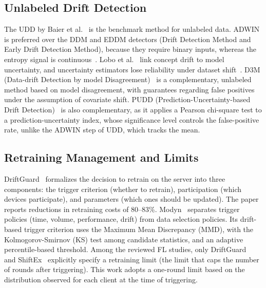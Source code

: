 \documentclass[conference]{IEEEtran}
\begin{document}
\subsection{Unlabeled Drift Detection}
The UDD by Baier et al.~\cite{baier2023} is the benchmark method for unlabeled data. ADWIN is preferred over the DDM and EDDM detectors (Drift Detection Method and Early Drift Detection Method), because they require binary inputs, whereas the entropy signal is continuous~\cite{baier2023}. Lobo et al.~\cite{lobo2023} link concept drift to model uncertainty, and uncertainty estimators lose reliability under dataset shift~\cite{ovadia2019}. D3M (Data-drift Detection by model Disagreement)~\cite{nguyen2025} is a complementary, unlabeled method based on model disagreement, with guarantees regarding false positives under the assumption of covariate shift. PUDD (Prediction-Uncertainty-based Drift Detection)~\cite{lu2025} is also complementary, as it applies a Pearson chi-square test to a prediction-uncertainty index, whose significance level controls the false-positive rate, unlike the ADWIN step of UDD, which tracks the mean.

\subsection{Retraining Management and Limits}
DriftGuard~\cite{han2026} formalizes the decision to retrain on the server into three components: the trigger criterion (whether to retrain), participation (which devices participate), and parameters (which ones should be updated). The paper reports reductions in retraining costs of 80--83\%. Modyn~\cite{bother2025} separates trigger policies (time, volume, performance, drift) from data selection policies. Its drift-based trigger criterion uses the Maximum Mean Discrepancy (MMD), with the Kolmogorov-Smirnov (KS) test among candidate statistics, and an adaptive percentile-based threshold. Among the reviewed FL studies, only DriftGuard~\cite{han2026} and ShiftEx~\cite{bhope2025} explicitly specify a retraining limit (the limit that caps the number of rounds after triggering). This work adopts a one-round limit based on the distribution observed for each client at the time of triggering.
\end{document}
